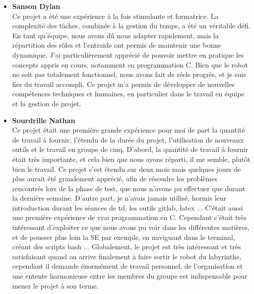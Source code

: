\begin{itemize}
    \item \textbf{Sanson Dylan}\\Ce projet a été une expérience à la fois stimulante et formatrice. La complexité des tâches, combinée à la gestion du temps, a été un véritable défi. En tant qu’équipe, nous avons dû nous adapter rapidement, mais la répartition des rôles et l’entraide ont permis de maintenir une bonne dynamique. J’ai particulièrement apprécié de pouvoir mettre en pratique les concepts appris en cours, notamment en programmation C. Bien que le robot ne soit pas totalement fonctionnel, nous avons fait de réels progrès, et je suis fier du travail accompli. Ce projet m’a permis de développer de nouvelles compétences techniques et humaines, en particulier dans le travail en équipe et la gestion de projet.
\end{itemize}
\vspace{5mm}

\begin{itemize}
    \item \textbf{Sourdrille Nathan}\\
    Ce projet était une première grande expérience pour moi de part la quantité de travail à fournir, l'étendu de la durée du projet, l'utilisation de nouveaux outils et le travail en groupe de cinq. D'abord, la quantité de travail à fournir était très importante, et cela bien que nous ayons réparti, il me semble, plutôt bien le travail. Ce projet s'est étendu sur deux mois mais quelques jours de plus aurait été grandement apprécié, afin de résoudre les problèmes rencontrés lors de la phase de test, que nous n'avons pu effectuer que durant la dernière semaine. D'autre part, je n'avais jamais utilisé, hormis leur introduction durant les séances de td, les outils gitlab, latex ... C'était aussi une première expérience de vrai programmation en C. Cependant c'était très intéressant d'exploiter ce que nous avons pu voir dans les différentes matières, et de pousser plus loin la SE par exemple, en naviguant dans le terminal, créant des scripts bash ... Globalement, le projet est très intéressant et très satisfaisant quand on arrive finalement à faire sortir le robot du labyrinthe, cependant il demande énormément de travail personnel, de l'organisation et une entente harmonieuse entre les membres du groupe est indispensable pour mener le projet à son terme.
\end{itemize}





